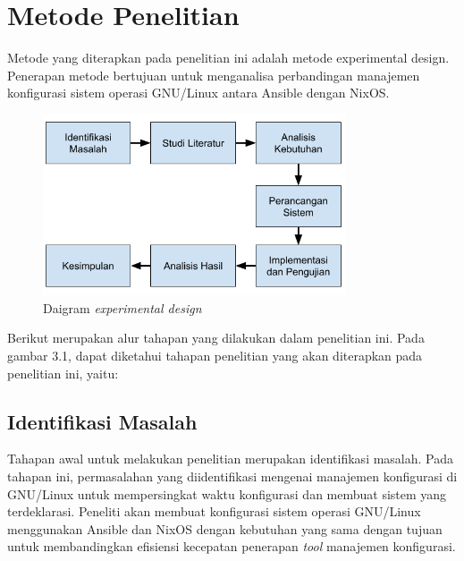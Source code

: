 \documentclass[10pt,twoside]{report}
\begin{document}
\section{Metode Penelitian}
\begin{adjustwidth}{20pt}{}

	\hspace\parindent
	Metode yang diterapkan pada penelitian ini adalah metode experimental design.
	Penerapan metode bertujuan untuk menganalisa perbandingan manajemen
	konfigurasi sistem operasi GNU/Linux antara Ansible dengan NixOS.

	\begin{figure}[h]
		\centering
		\includegraphics[width=0.8\textwidth]{images/metpen.png}
		\caption{Daigram \textit{experimental design}}
	\end{figure}

\end{adjustwidth}
\begin{adjustwidth}{20pt}{}
	\hspace\parindent
	Berikut merupakan alur tahapan yang dilakukan dalam penelitian ini.
	Pada gambar 3.1, dapat diketahui tahapan penelitian yang akan diterapkan
	pada penelitian ini, yaitu:
\end{adjustwidth}
\begin{adjustwidth}{20pt}{}
	\subsection{Identifikasi Masalah}
	\begin{adjustwidth}{20pt}{}
		Tahapan awal untuk melakukan penelitian merupakan identifikasi masalah. Pada
		tahapan ini, permasalahan yang diidentifikasi mengenai manajemen konfigurasi
		di GNU/Linux untuk mempersingkat waktu konfigurasi dan membuat sistem yang
		terdeklarasi. Peneliti akan membuat konfigurasi sistem operasi GNU/Linux
		menggunakan Ansible dan NixOS dengan kebutuhan yang sama dengan tujuan untuk
		membandingkan efisiensi kecepatan penerapan \textit{tool} manajemen konfigurasi.
	\end{adjustwidth}
\end{adjustwidth}
\end{document}
